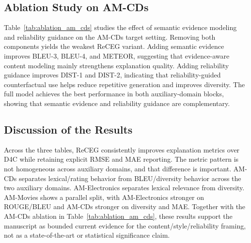 \subsection{Ablation Study on AM-CDs}



Table~\ref{tab:ablation_am_cds} studies the effect of semantic evidence
modeling and reliability guidance on the AM-CDs target setting. Removing both
components yields the weakest ReCEG variant. Adding semantic evidence improves
BLEU-3, BLEU-4, and METEOR, suggesting that evidence-aware content modeling
mainly strengthens explanation quality. Adding reliability guidance improves
DIST-1 and DIST-2, indicating that reliability-guided counterfactual use helps
reduce repetitive generation and improves diversity. The full model achieves
the best performance in both auxiliary-domain blocks, showing that semantic
evidence and reliability guidance are complementary.

\subsection{Discussion of the Results}

Across the three tables, ReCEG consistently improves explanation metrics over
D4C while retaining explicit RMSE and MAE reporting. The metric pattern is not
homogeneous across auxiliary domains, and that difference is important. AM-CDs
separates lexical/rating behavior from BLEU/diversity behavior across the two
auxiliary domains. AM-Electronics separates lexical relevance from diversity.
AM-Movies shows a parallel split, with AM-Electronics stronger on ROUGE/BLEU
and AM-CDs stronger on diversity and MAE. Together with the AM-CDs ablation in
Table~\ref{tab:ablation_am_cds}, these results support the manuscript as
bounded current evidence for the content/style/reliability framing, not as a
state-of-the-art or statistical significance claim.
